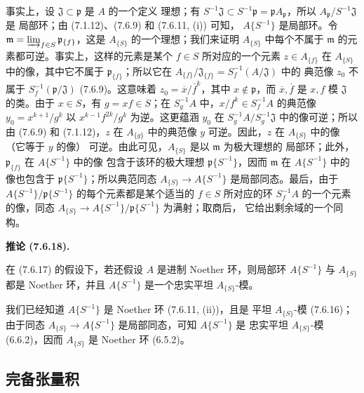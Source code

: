 \documentclass[UTF8,fontset=none,11pt,oneside,openany]{ctexbook}
\newenvironment{corollary}[1][]{%
  \par\medskip\noindent\textbf{推论 (#1).}\ %
}{\par}
\let\EGAOriginalLabel\label
\renewcommand{\label}[1]{\phantomsection\EGAOriginalLabel{#1}}
\begin{document}
事实上，设 $\mathfrak J\subset\mathfrak p$ 是 $A$ 的一个定义
理想；有
$S^{-1}\mathfrak J\subset S^{-1}\mathfrak p=\mathfrak p
A_{\mathfrak p}$，所以 $A_{\mathfrak p}/S^{-1}\mathfrak J$ 是
局部环；由 (7.1.12)、(7.6.9) 和 (7.6.11, (i)) 可知，
$A\{S^{-1}\}$ 是局部环。令
$\mathfrak m=\varinjlim_{f\in S}\mathfrak p_{\{f\}}$，这是
$A_{\{S\}}$ 的一个理想；我们来证明 $A_{\{S\}}$ 中每个不属于
$\mathfrak m$ 的元素都可逆。事实上，这样的元素是某个
$f\in S$ 所对应的一个元素
$z\in A_{\{f\}}$ 在 $A_{\{S\}}$ 中的像，其中它不属于
$\mathfrak p_{\{f\}}$；所以它在
$A_{\{f\}}/\mathfrak J_{\{f\}}=S_f^{-1}(A/\mathfrak J)$ 中的
典范像 $z_0$ 不属于
$S_f^{-1}(\mathfrak p/\mathfrak J)$ (7.6.9)。这意味着
$z_0=\overline{x}/\overline{f}^k$，其中
$x\notin\mathfrak p$，而 $\overline{x},\overline{f}$ 是 $x,f$
模 $\mathfrak J$ 的类。由于 $x\in S$，有 $g=xf\in S$；在
$S_g^{-1}A$ 中，$x/f^k\in S_f^{-1}A$ 的典范像
$y_0=x^{k+1}/g^k$ 以 $x^{k-1}f^{2k}/g^k$ 为逆。这更蕴涵
$y_0$ 在 $S_g^{-1}A/S_g^{-1}\mathfrak J$ 中的像可逆；所以由
(7.6.9) 和 (7.1.12)，$z$ 在 $A_{\{g\}}$ 中的典范像 $y$
可逆。因此，$z$ 在 $A_{\{S\}}$ 中的像（它等于 $y$ 的像）
可逆。由此可见，$A_{\{S\}}$ 是以 $\mathfrak m$ 为极大理想的
局部环；此外，$\mathfrak p_{\{f\}}$ 在 $A\{S^{-1}\}$ 中的像
包含于该环的极大理想 $\mathfrak p\{S^{-1}\}$，因而
$\mathfrak m$ 在 $A\{S^{-1}\}$ 中的像也包含于
$\mathfrak p\{S^{-1}\}$；所以典范同态
$A_{\{S\}}\to A\{S^{-1}\}$ 是局部同态。最后，由于
$A\{S^{-1}\}/\mathfrak p\{S^{-1}\}$ 的每个元素都是某个适当的
$f\in S$ 所对应的环 $S_f^{-1}A$ 的一个元素的像，同态
$A_{\{S\}}\to A\{S^{-1}\}/\mathfrak p\{S^{-1}\}$ 为满射；取商后，
它给出剩余域的一个同构。

\begin{corollary}[7.6.18]
\label{0.7.6.18-fr}
在 (7.6.17) 的假设下，若还假设 $A$ 是进制 Noether 环，则局部环
$A\{S^{-1}\}$ 与 $A_{\{S\}}$ 都是 Noether 环，并且
$A\{S^{-1}\}$ 是一个忠实平坦 $A_{\{S\}}$-模。
\end{corollary}

我们已经知道 $A\{S^{-1}\}$ 是 Noether 环 (7.6.11, (ii))，且是
平坦 $A_{\{S\}}$-模 (7.6.16)；由于同态
$A_{\{S\}}\to A\{S^{-1}\}$ 是局部同态，可知 $A\{S^{-1}\}$ 是
忠实平坦 $A_{\{S\}}$-模 (6.6.2)，因而 $A_{\{S\}}$ 是 Noether 环
(6.5.2)。

\subsection{完备张量积}
\label{subsection:0.7.7-fr}
\end{document}
